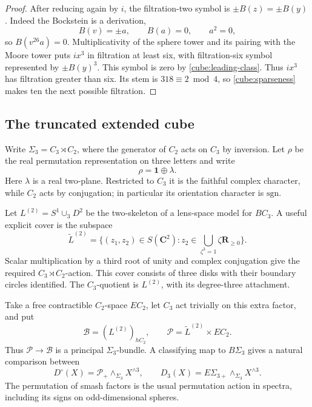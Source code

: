 \documentclass[11pt]{article}
\theoremstyle{definition}
\theoremstyle{remark}
\numberwithin{equation}{section}
\begin{document}
\begin{proof}
After reducing again by \(i\), the filtration-two symbol is
\(\pm B(z)=\pm B(y)\).  Indeed the Bockstein is a derivation,
\[
 B(v)=\pm a,\qquad B(a)=0,\qquad a^2=0,
\]
so \(B(v^{26}a)=0\).  Multiplicativity of the sphere tower and its
pairing with the Moore tower puts \(ix^3\) in filtration at least
six, with filtration-six symbol represented by \(\pm B(y)^3\).
This symbol is zero by \eqref{cube:leading-class}.  Thus \(ix^3\)
has filtration greater than six.  Its stem is \(318\equiv2\bmod4\),
so \eqref{cube:sparseness} makes ten the next possible filtration.
\end{proof}

\subsection{The truncated extended cube}

Write \(\Sigma_3=C_3\rtimes C_2\), where the generator of \(C_2\)
acts on \(C_3\) by inversion.  Let \(\rho\) be the real permutation
representation on three letters and write
\[
 \rho=\mathbf1\oplus\lambda.
\]
Here \(\lambda\) is a real two-plane.  Restricted to \(C_3\) it is
the faithful complex character, while \(C_2\) acts by conjugation;
in particular its orientation character is \(\mathrm{sgn}\).

Let \(L^{(2)}=S^1\cup_3D^2\) be the two-skeleton of a lens-space
model for \(BC_3\).  A useful explicit cover is the subspace
\[
 \widetilde L^{(2)}
 =\{(z_1,z_2)\in S(\mathbf C^2):
       z_2\in\bigcup_{\zeta^3=1}\zeta\mathbf R_{\geq0}\}.
\]
Scalar multiplication by a third root of unity and complex
conjugation give the required \(C_3\rtimes C_2\)-action.  This
cover consists of three disks with their boundary circles
identified.  The \(C_3\)-quotient is \(L^{(2)}\), with its
degree-three attachment.

Take a free contractible \(C_2\)-space \(EC_2\), let \(C_3\) act
trivially on this extra factor, and put
\[
 \mathcal B=(L^{(2)})_{hC_2},\qquad
 \mathcal P=\widetilde L^{(2)}\times EC_2.
\]
Thus \(\mathcal P\to\mathcal B\) is a principal \(\Sigma_3\)-bundle.
A classifying map to \(B\Sigma_3\) gives a natural comparison
between
\begin{equation}\label{cube:truncated-functor}
 D^\circ(X)=\mathcal P_+\wedge_{\Sigma_3}X^{\wedge3},
 \qquad
 D_3(X)=E\Sigma_{3+}\wedge_{\Sigma_3}X^{\wedge3}.
\end{equation}
The permutation of smash factors is the usual permutation action
in spectra, including its signs on odd-dimensional spheres.
\end{document}
